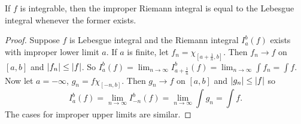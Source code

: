 \begin{proposition}
	If $f$ is integrable, then the improper Riemann integral is equal to the
	Lebesgue integral whenever the former exists.
\end{proposition}

\begin{proof}
	Suppose $f$ is Lebesgue integral and the Riemann integral
	$I_a^b(f)$ exists with improper lower limit $a$.
	If $a$ is finite, let $f_n = \chi_{\left[ a + \frac1n, b \right]}$.
	Then $f_n \to f$ on $[a,b]$ and $\left\lvert f_n \right\rvert \leq \left\lvert f \right\rvert$.
	So $I_a^b(f) = \lim_{n \to \infty} I_{a + \frac 1n}^b(f)
	= \lim_{n \to \infty} \int f_n = \int f$.
	Now let $a = -\infty$, $g_n = f \chi_{\left[ -n, b \right]}$.
	Then $g_n \to f$ on $[a,b]$ and $\left\lvert g_n \right\rvert \leq \left\lvert f \right\rvert$ so
	\[
		I_a^b(f) = \lim_{n \to \infty} I_{-n}^b (f)
		= \lim_{n \to \infty} \int g_n = \int f.
	\]
	The cases for improper upper limits are similar.
\end{proof}